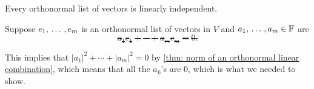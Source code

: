 \begin{thm}
  \label{thm: orthonormal lists are linearly independent}
  Every orthonormal list of vectors is linearly independent.
\end{thm}
\begin{prf}
  Suppose $e_1, {\, \ldots \,\,}, e_m$ is an orthonormal list of vectors in $V$ and $a_1, {\, \ldots \,\,}, a_m \in \mathbb{F}$ are \st
  \begin{equation}
    a_1e_1 + \cdots + a_m e_m = 0.
  \end{equation}

  This implies that $|a_1|^2 + \cdots + |a_m|^2 = 0$ by \ref{thm: norm of an orthonormal linear combination}, which means that all the $a_k$'s are $0$, which is what we needed to show.
\end{prf}

